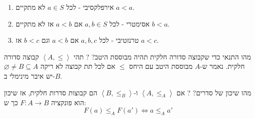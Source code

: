 \documentclass{tstextbook}
\begin{document}
\begin{enumerate}
  \item אירפלקסיבי - לכל \(a \in S\) לא מתקיים \(a< a\). 


  \item אסימטרי - לכל \(a,b \in S\) אם \(a< b\) אז לא מתקיים \(b < a\). 


  \item טרנזטיבי - לכל \(a,b,c\) אם \(a<b\) וגם \(b<c\) אז \(a< c\). 


\end{enumerate}
מהו התנאי כדי שקבוצה סדורה חלקית תהיה מבוססת היטב?
?
תהי \(\left\langle  A,\leq  \right\rangle\) קבוצה סדורה חלקית. נאמר ש-\(A\) מבוססת היטב עם היחס \(\leq\) אם לכל תת קבוצה לא ריקה \(\varnothing \neq B \subseteq A\) יש איבר מינימלי ב-\(B\).

מהו שיכון של סדרים?
?
אם \(\left\langle  A,\leq_{A}  \right\rangle\) ו-\(\left\langle  B,\leq_{B}  \right\rangle\) הם קבוצות סדרות חלקית, אז שיכון הוא פונקציה \(F:A\to B\) כך ש:
$$F(a)\leq_{A}F(a')\iff a \leq_{A}a'$$
\end{document}
